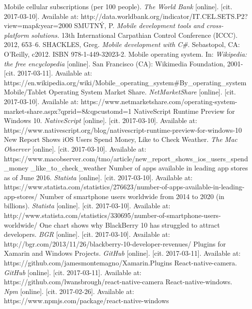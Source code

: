 \documentclass[english,master,public,dept460,male,cpdeclaration,oneside]{diploma}
\begin{document}
\begin{thebibliography}{99}
	 Mobile cellular subscriptions (per 100 people). \textit{The World Bank} [online]. [cit. 2017-03-10]. Available at: http://data.worldbank.org/indicator/IT.CEL.SETS.P2?view=map\&year=2000
	SMUTNÝ, P. \textit{Mobile development tools and cross-platform solutions.} 13th International Carpathian Control Conference (ICCC). 2012, 653–6.
	 SHACKLES, Greg. \textit{Mobile development with C\#}. Sebastopol, CA: O'Reilly, c2012. ISBN 978-1-449-32023-2.
	 Mobile operating system. In: \textit{Wikipedia: the free encyclopedia} [online]. San Francisco (CA): Wikimedia Foundation, 2001- [cit. 2017-03-11]. Available at: https://en.wikipedia.org/wiki/Mobile\_operating\_system\#By\_operating\_system
	 Mobile/Tablet Operating System Market Share. \textit{NetMarketShare} [online]. [cit. 2017-03-10]. Available at: https://www.netmarketshare.com/operating-system-market-share.aspx?qprid=8\&qpcustomd=1
	 NativeScript Runtime Preview for Windows 10. \textit{NativeScript} [online]. [cit. 2017-03-10]. Available at: https://www.nativescript.org/blog/nativescript-runtime-preview-for-windows-10
	 New Report Shows iOS Users Spend Money, Like to Check Weather. \textit{The Mac Observer} [online]. [cit. 2017-03-10]. Available at: https://www.macobserver.com/tmo/article/new\_report\_shows\_ios\_users\_spend\_money \_like\_to\_check\_weather
	 Number of apps available in leading app stores as of June 2016. \textit{Statista} [online]. [cit. 2017-03-10]. Available at: https://www.statista.com/statistics/276623/number-of-apps-available-in-leading-app-stores/
	 Number of smartphone users worldwide from 2014 to 2020 (in billions). \textit{Statista} [online]. [cit. 2017-03-10]. Available at: http://www.statista.com/statistics/330695/number-of-smartphone-users-worldwide/
	 One chart shows why BlackBerry 10 has struggled to attract developers. \textit{BGR} [online]. [cit. 2017-03-10]. Available at: http://bgr.com/2013/11/26/blackberry-10-developer-revenues/
	 Plugins for Xamarin and Windows Projects. \textit{GitHub} [online]. [cit. 2017-03-11]. Available at: https://github.com/jamesmontemagno/Xamarin.Plugins
	 React-native-camera. \textit{GitHub} [online]. [cit. 2017-03-11]. Available at: https://github.com/lwansbrough/react-native-camera
	 React-native-windows. \textit{Npm} [online]. [cit. 2017-02-26]. Available at: https://www.npmjs.com/package/react-native-windows

\end{thebibliography}
\end{document}
